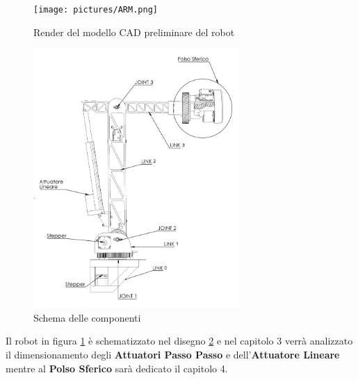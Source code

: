 \documentclass[%
corpo=11pt,
twoside,
 stile=classica,
oldstyle,
greek,%
]{toptesi}
\begin{document}
	\begin{figure}
	\centering
	\texttt{[image: pictures/ARM.png]}
	\caption{Render del modello CAD preliminare del robot}
	\label{fig:render}
\end{figure}
	\begin{figure}
	\centering
	\includegraphics[width=0.7\textwidth]{Screen/ARMBollato.png}
	\caption{Schema delle componenti}
	\label{fig:bollatura}
\end{figure}
Il robot in figura \ref{fig:render} è schematizzato nel disegno \ref{fig:bollatura} e nel capitolo 3 verrà analizzato il dimensionamento degli  \textbf{Attuatori Passo Passo} e dell'\textbf{Attuatore Lineare} mentre al \textbf{Polso Sferico} sarà dedicato il capitolo 4. 

	
\end{document}
